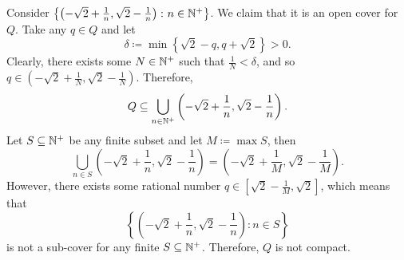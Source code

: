 \documentclass[math]{amznotes}
\theoremstyle{remark}
\begin{document}
Consider $\left\{\left(-\sqrt{2} + \frac{1}{n}, \sqrt{2} - \frac{1}{n}\right) \colon n \in \mathbb{N}^+\right\}$. We claim that it is an open cover for $Q$. Take any $q \in Q$ and let 
\begin{equation*}
    \delta \coloneqq \min\left\{\sqrt{2} - q, q + \sqrt{2}\right\} > 0.
\end{equation*}
Clearly, there exists some $N \in \mathbb{N}^+$ such that $\frac{1}{N} < \delta$, and so $q \in \left(-\sqrt{2} + \frac{1}{N}, \sqrt{2} - \frac{1}{N}\right)$. Therefore, 
\begin{equation*}
    Q \subseteq \bigcup_{n \in \mathbb{N}^+}\left(-\sqrt{2} + \frac{1}{n}, \sqrt{2} - \frac{1}{n}\right).
\end{equation*} 
Let $S \subseteq \mathbb{N}^+$ be any finite subset and let $M \coloneqq \max S$, then 
\begin{equation*}
    \bigcup_{n \in S}\left(-\sqrt{2} + \frac{1}{n}, \sqrt{2} - \frac{1}{n}\right) = \left(-\sqrt{2} + \frac{1}{M}, \sqrt{2} - \frac{1}{M}\right).
\end{equation*}
However, there exists some rational number $q \in \left[\sqrt{2} - \frac{1}{M}, \sqrt{2}\right]$, which means that 
\begin{equation*}
    \left\{\left(-\sqrt{2} + \frac{1}{n}, \sqrt{2} - \frac{1}{n}\right) \colon n \in S\right\}
\end{equation*}
is not a sub-cover for any finite $S \subseteq \mathbb{N}^+$. Therefore, $Q$ is not compact.
\end{document}
